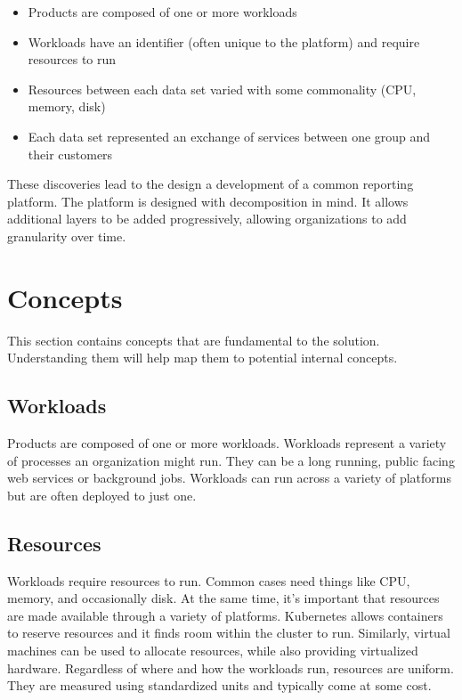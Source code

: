 \documentclass[10pt, a4paper, twocolumn]{article}
\begin{document}
  \begin{itemize}
    \item Products are composed of one or more workloads
    \item Workloads have an identifier (often unique to the platform) and require resources to run
    \item Resources between each data set varied with some commonality (CPU, memory, disk)
    \item Each data set represented an exchange of services between one group and their customers
  \end{itemize}

  These discoveries lead to the design a development of a common reporting platform.
  The platform is designed with decomposition in mind.
  It allows additional layers to be added progressively, allowing organizations to add granularity over time.

\section*{Concepts}
  This section contains concepts that are fundamental to the solution.
  Understanding them will help map them to potential internal concepts.

  \subsection*{Workloads}
    Products are composed of one or more workloads.
    Workloads represent a variety of processes an organization might run.
    They can be a long running, public facing web services or background jobs.
    Workloads can run across a variety of platforms but are often deployed to just one.

  \subsection*{Resources}
    Workloads require resources to run.
    Common cases need things like CPU, memory, and occasionally disk.
    At the same time, it's important that resources are made available through a variety of platforms.
    Kubernetes allows containers to reserve resources and it finds room within the cluster to run.
    Similarly, virtual machines can be used to allocate resources, while also providing virtualized hardware.
    Regardless of where and how the workloads run, resources are uniform.
    They are measured using standardized units and typically come at some cost.
\end{document}
